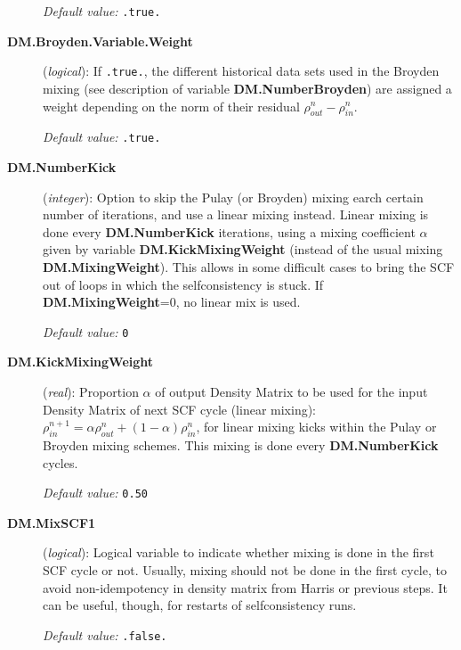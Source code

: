 \documentclass[11pt]{article}
\begin{document}
\begin{description}
{\it Default value:} {\tt .true.}

\item[{\bf DM.Broyden.Variable.Weight}] ({\it logical}): 
If {\tt .true.}, the different historical data sets used in
the Broyden mixing (see description of variable {\bf
  DM.NumberBroyden}) are assigned a weight depending on the
norm of their residual ${\rho}^{n}_{out}-{\rho}^{n}_{in}$.

{\it Default value:} {\tt .true.}

\item[{\bf DM.NumberKick}] ({\it integer}): 
Option to skip the Pulay (or Broyden) mixing earch certain number of iterations,
and use a linear mixing instead. Linear mixing is done
every {\bf DM.NumberKick} iterations, using a mixing coefficient
$\alpha$ given by variable {\bf DM.KickMixingWeight} 
(instead of the usual mixing {\bf DM.MixingWeight}).
This allows in some difficult cases to bring the SCF out of
loops in which the selfconsistency is stuck.
If {\bf DM.MixingWeight}=0, no linear mix is used.

{\it Default value:} {\tt 0}

\item[{\bf DM.KickMixingWeight}] ({\it real}):
Proportion $\alpha$ of 
output Density Matrix to be used for the input Density Matrix of 
next SCF cycle (linear mixing):
$\rho^{n+1}_{in} = \alpha \rho^{n}_{out} 
+(1 - \alpha) \rho^{n}_{in}$, for linear mixing kicks within the
Pulay or Broyden mixing schemes. 
This mixing is done every {\bf DM.NumberKick} cycles.

{\it Default value:} {\tt 0.50}


\item[{\bf DM.MixSCF1}] ({\it logical}):
Logical variable to indicate whether mixing is done in the
first SCF cycle or not. Usually, mixing should not be done in
the first cycle, to avoid non-idempotency in density matrix
from Harris or previous steps. It can be useful, though,
for restarts of selfconsistency runs.

{\it Default value:} {\tt .false.}



\end{description}
\end{document}
